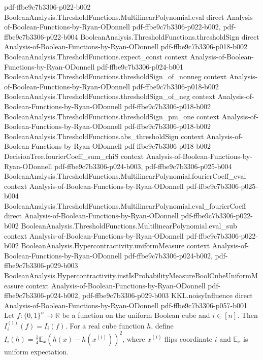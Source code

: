 \begin{lemma}
  {pdf-ffbe9c7b3306-p022-b002}
\proofstep
  {BooleanAnalysis.ThresholdFunctions.MultilinearPolynomial.eval}
  {direct}
  {Analysis-of-Boolean-Functions-by-Ryan-ODonnell}
  {pdf-ffbe9c7b3306-p022-b002,
    pdf-ffbe9c7b3306-p022-b004}
\proofstep
  {BooleanAnalysis.ThresholdFunctions.thresholdSign}
  {direct}
  {Analysis-of-Boolean-Functions-by-Ryan-ODonnell}
  {pdf-ffbe9c7b3306-p018-b002}
\proofstep
  {BooleanAnalysis.ThresholdFunctions.expect_const}
  {context}
  {Analysis-of-Boolean-Functions-by-Ryan-ODonnell}
  {pdf-ffbe9c7b3306-p024-b001}
\proofstep
  {BooleanAnalysis.ThresholdFunctions.thresholdSign_of_nonneg}
  {context}
  {Analysis-of-Boolean-Functions-by-Ryan-ODonnell}
  {pdf-ffbe9c7b3306-p018-b002}
\proofstep
  {BooleanAnalysis.ThresholdFunctions.thresholdSign_of_neg}
  {context}
  {Analysis-of-Boolean-Functions-by-Ryan-ODonnell}
  {pdf-ffbe9c7b3306-p018-b002}
\proofstep
  {BooleanAnalysis.ThresholdFunctions.thresholdSign_pm_one}
  {context}
  {Analysis-of-Boolean-Functions-by-Ryan-ODonnell}
  {pdf-ffbe9c7b3306-p018-b002}
\proofstep
  {BooleanAnalysis.ThresholdFunctions.abs_thresholdSign}
  {context}
  {Analysis-of-Boolean-Functions-by-Ryan-ODonnell}
  {pdf-ffbe9c7b3306-p018-b002}
\proofstep
  {DecisionTree.fourierCoeff_sum_chiS}
  {context}
  {Analysis-of-Boolean-Functions-by-Ryan-ODonnell}
  {pdf-ffbe9c7b3306-p024-b003,
    pdf-ffbe9c7b3306-p025-b004}
\proofstep
  {BooleanAnalysis.ThresholdFunctions.MultilinearPolynomial.fourierCoeff_eval}
  {context}
  {Analysis-of-Boolean-Functions-by-Ryan-ODonnell}
  {pdf-ffbe9c7b3306-p025-b004}
\proofstep
  {BooleanAnalysis.ThresholdFunctions.MultilinearPolynomial.eval_fourierCoeff}
  {direct}
  {Analysis-of-Boolean-Functions-by-Ryan-ODonnell}
  {pdf-ffbe9c7b3306-p022-b002}
\proofstep
  {BooleanAnalysis.ThresholdFunctions.MultilinearPolynomial.eval_sub}
  {context}
  {Analysis-of-Boolean-Functions-by-Ryan-ODonnell}
  {pdf-ffbe9c7b3306-p022-b002}
\proofstep
  {BooleanAnalysis.Hypercontractivity.uniformMeasure}
  {context}
  {Analysis-of-Boolean-Functions-by-Ryan-ODonnell}
  {pdf-ffbe9c7b3306-p024-b002,
    pdf-ffbe9c7b3306-p029-b003}
\proofstep
  {BooleanAnalysis.Hypercontractivity.instIsProbabilityMeasureBoolCubeUniformMeasure}
  {context}
  {Analysis-of-Boolean-Functions-by-Ryan-ODonnell}
  {pdf-ffbe9c7b3306-p024-b002,
    pdf-ffbe9c7b3306-p029-b003}
\proofstep
  {KKL.noisyInfluence}
  {direct}
  {Analysis-of-Boolean-Functions-by-Ryan-ODonnell}
  {pdf-ffbe9c7b3306-p057-b001}
\label{KKL.noisyInfluence_one}
Let $f:\{0,1\}^n\to\mathbb R$ be a function on the uniform Boolean cube and $i\in[n]$.
Then $I_i^{(1)}(f)=I_i(f)$. For a real cube function $h$, define $I_i(h)=\tfrac14\mathbb
E_x(h(x)-h(x^{(i)}))^2$, where $x^{(i)}$ flips coordinate $i$ and $\mathbb E_x$ is
uniform expectation.
\end{lemma}

